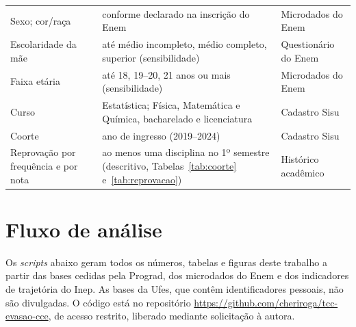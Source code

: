 \documentclass[12pt,a4paper]{article}
\begin{document}
\begin{small}
\begin{longtable}{@{}>{\raggedright\arraybackslash}p{3.2cm}>{\raggedright\arraybackslash}p{8.0cm}>{\raggedright\arraybackslash}p{3.4cm}@{}}
  Sexo; cor/raça & conforme declarado na inscrição do Enem & Microdados do Enem \\
  Escolaridade da mãe & até médio incompleto, médio completo, superior (sensibilidade) & Questionário do Enem \\
  Faixa etária & até 18, 19--20, 21 anos ou mais (sensibilidade) & Microdados do Enem \\
  Curso & Estatística; Física, Matemática e Química, bacharelado e licenciatura & Cadastro Sisu \\
  Coorte & ano de ingresso (2019--2024) & Cadastro Sisu \\
  Reprovação por frequência e por nota & ao menos uma disciplina no 1º semestre (descritivo, Tabelas~\ref{tab:coorte} e~\ref{tab:reprovacao}) & Histórico acadêmico \\
\end{longtable}
\end{small}


\section{Fluxo de análise}
\label{apendice:pipeline}

Os \textit{scripts} abaixo geram todos os números, tabelas e figuras deste trabalho a partir das bases cedidas pela Prograd, dos microdados do Enem e dos indicadores de trajetória do Inep. As bases da Ufes, que contêm identificadores pessoais, não são divulgadas. O código está no repositório \url{https://github.com/cheriroga/tcc-evasao-cce}, de acesso restrito, liberado mediante solicitação à autora.
\end{document}

